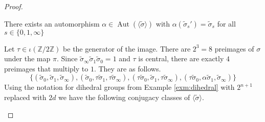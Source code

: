 \documentclass{dcthesis}
\newcommand{\ZZ}{\mathbb Z}
\newcommand{\wt}[1]{\widetilde{#1}}
\DeclareMathOperator{\Aut}{Aut}
\numberwithin{equation}{section}
\theoremstyle{definition}
\theoremstyle{remark}
\begin{document}
{{{\begin{proof}
\begin{enumerate}
          There exists an automorphism
          $\alpha\in\Aut(\langle\wt{\sigma}\rangle)$
          with
          $\alpha(\wt{\sigma}_s') = \wt{\sigma}_s$
          for all $s\in \{0,1,\infty\}$
      \end{enumerate}
      Let $\tau\in\iota(\ZZ/2\ZZ)$
      be the generator of the image.
      There are $2^3 = 8$ preimages of $\sigma$
      under the map $\pi$.
      Since $\wt{\sigma}_\infty
      \wt{\sigma}_1\wt{\sigma}_0=1$
      and $\tau$ is central,
      there are exactly $4$ preimages
      that multiply to $1$.
      They are as follows.
      \begin{equation}
        \label{eqn:preimagesto1}
        \{
          (\wt{\sigma}_0,\wt{\sigma}_1,\wt{\sigma}_\infty),
          (\wt{\sigma}_0,\tau\wt{\sigma}_1,\tau\wt{\sigma}_\infty),
          (\tau\wt{\sigma}_0,\wt{\sigma}_1,\tau\wt{\sigma}_\infty),
          (\tau\wt{\sigma}_0,\alpha\wt{\sigma}_1,\wt{\sigma}_\infty)
        \}
      \end{equation}
      Using the notation for dihedral groups
      from Example \ref{exm:dihedral}
      with $2^{n+1}$ replaced with $2d$
      we have the following conjugacy classes
      of $\langle\wt{\sigma}\rangle$.
      \begin{itemize}

\end{itemize}
\end{proof}}}}
\end{document}
